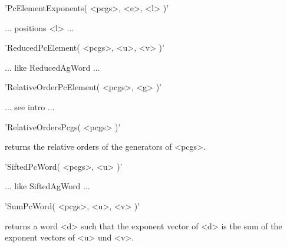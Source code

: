 'PcElementExponents( <pcgs>, <e>, <l> )'

... positions <l> ...


'ReducedPcElement( <pcgs>, <u>, <v> )'

... like ReducedAgWord ...


'RelativeOrderPcElement( <pcgs>, <g> )'

... see intro ...


'RelativeOrdersPcgs( <pcgs> )'

returns the relative orders of the generators of <pcgs>.


'SiftedPcWord( <pcgs>, <u> )'

... like SiftedAgWord ...


'SumPcWord( <pcgs>, <u>, <v> )'

returns a word <d> such that the exponent vector of <d> is the sum of the
exponent vectors of <u> und <v>.
